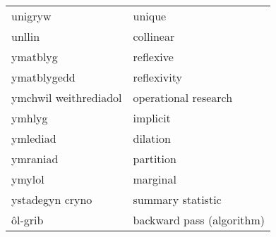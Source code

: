 \begin{supertabular}{p{0.22\textwidth}p{0.22\textwidth}}
unigryw & unique \\
unllin & collinear \\
ymatblyg & reflexive \\
ymatblygedd & reflexivity \\
ymchwil weithrediadol & operational research \\
ymhlyg & implicit \\
ymlediad & dilation \\
ymraniad & partition \\
ymylol & marginal \\
ystadegyn cryno & summary statistic \\
ôl-grib & backward pass (algorithm) \\
\end{supertabular}
